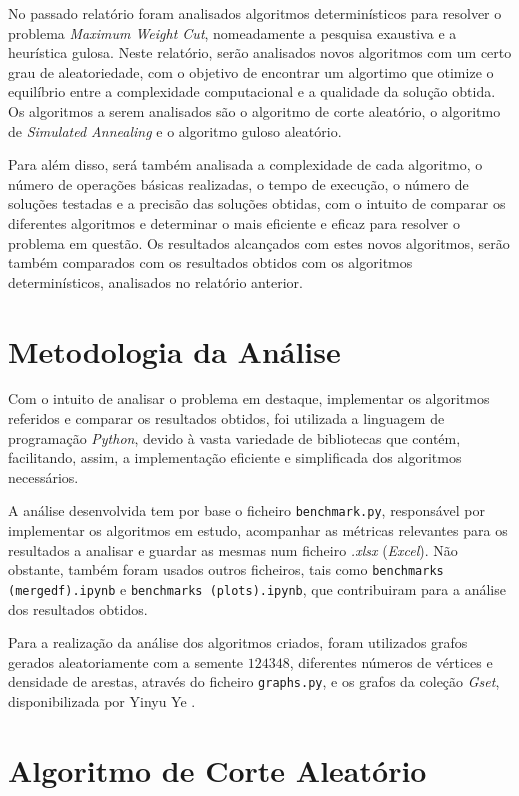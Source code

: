 \documentclass[mirror, portugues]{revdetua}
\begin{document}
No passado relatório foram analisados algoritmos determinísticos para resolver o problema \textit{Maximum Weight Cut}, nomeadamente a pesquisa exaustiva e a heurística gulosa. Neste relatório, serão analisados novos algoritmos com um certo grau de aleatoriedade, com o objetivo de encontrar um algortimo que otimize o equilíbrio entre a complexidade computacional e a qualidade da solução obtida. Os algoritmos a serem analisados são o algoritmo de corte aleatório, o algoritmo de \textit{Simulated Annealing} e o algoritmo guloso aleatório.

Para além disso, será também analisada a complexidade de cada algoritmo, o número de operações básicas realizadas, o tempo de execução, o número de soluções testadas e a precisão das soluções obtidas, com o intuito de comparar os diferentes algoritmos e determinar o mais eficiente e eficaz para resolver o problema em questão. Os resultados alcançados com estes novos algoritmos, serão também comparados com os resultados obtidos com os algoritmos determinísticos, analisados no relatório anterior.

\section{Metodologia da Análise}

Com o intuito de analisar o problema em destaque, implementar os algoritmos referidos e comparar os resultados obtidos, foi utilizada a linguagem de programação \textit{Python}, devido à vasta variedade de bibliotecas que contém, facilitando, assim, a implementação eficiente e simplificada dos algoritmos necessários.

A análise desenvolvida tem por base o ficheiro \texttt{benchmark.py}, responsável por implementar os algoritmos em estudo, acompanhar as métricas relevantes para os resultados a analisar e guardar as mesmas num ficheiro \textit{.xlsx} (\textit{Excel}). Não obstante, também foram usados outros ficheiros, tais como \texttt{benchmarks (mergedf).ipynb} e \texttt{benchmarks (plots).ipynb}, que contribuiram para a análise dos resultados obtidos.

Para a realização da análise dos algoritmos criados, foram utilizados grafos gerados aleatoriamente com a semente $124348$, diferentes números de vértices e densidade de arestas, através do ficheiro \texttt{graphs.py}, e os grafos da coleção \textit{Gset}, disponibilizada por Yinyu Ye \cite{GS24}.

\section{Algoritmo de Corte Aleatório}
\end{document}
